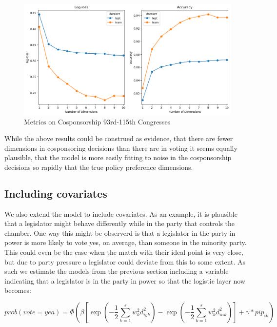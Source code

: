 \documentclass[11pt,]{article}
\begin{document}
\begin{figure}

{\centering \includegraphics[width=1\linewidth]{full_cosponsor_metrics}

}

\caption{\label{fig:fullcosponsorsmetrics}Metrics on Cosponsorship 93rd-115th Congresses}\label{fig:unnamed-chunk-10}
\end{figure}

While the above results could be construed as evidence, that there are
fewer dimensions in cosponsoring decisions than there are in voting it
seems equally plausible, that the model is more easily fitting to noise
in the cosponsorship decisions so rapidly that the true policy
preference dimensions.

\subsection{Including covariates}\label{including-covariates}

We also extend the model to include covariates. As an example, it is
plausible that a legislator might behave differently while in the party
that controls the chamber. One way this might be observerd is that a
legislator in the party in power is more likely to vote yes, on average,
than someone in the minority party. This could even be the case when the
match with their ideal point is very close, but due to party pressure a
legislator could deviate from this to some extent. As such we estimate
the models from the previous section including a variable indicating
that a legislator is in the party in power so that the logistic layer
now becomes:

\begin{equation}
prob(vote=yea) = \Phi\left(\beta \left[\exp\left(-\frac{1}{2}\sum_{k=1}^s w_k^2 d_{iyk}^2 \right) - \exp\left({-\frac{1}{2}\sum_{k=1}^s w_k^2 d_{ink}^2 }\right)\right] + \gamma * pip_{ik}\right)
\end{equation}
\end{document}
